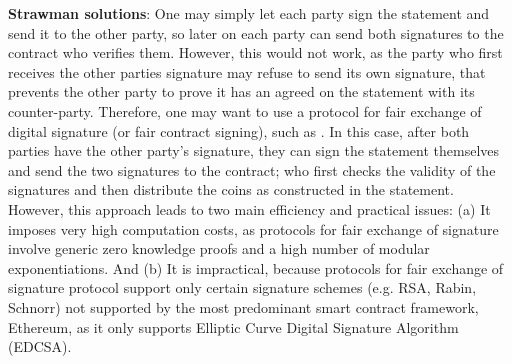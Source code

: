  \noindent\textbf{Strawman solutions}: One may simply let each party  sign the statement and send it to the other party, so later on each party can send both signatures to the contract who verifies them. However, this would not work,  as the party who first receives the other parties signature  may refuse  to send its own signature, that prevents the other party to prove it has an agreed on the statement with its counter-party. Therefore, one may want to use a protocol for fair exchange of digital signature (or fair contract signing), such as \cite{BonehN00,DBLP:conf/fc/GarayJ02}. In this case, after both parties have the other party's signature, they can sign the statement themselves and send the two signatures to the contract; who first checks the validity of the signatures and then distribute the coins as constructed in the statement. However, this approach leads to two main efficiency and practical issues: (a) It imposes very high computation costs, as  protocols for fair exchange of signature involve generic zero knowledge proofs and a high number of modular exponentiations. And (b) It is impractical, because protocols for fair exchange of signature protocol support only certain signature schemes (e.g. RSA, Rabin, Schnorr) not supported by the most predominant  smart contract framework,  Ethereum, as it only supports  Elliptic Curve Digital Signature Algorithm (EDCSA).

